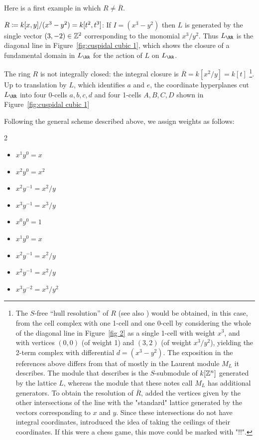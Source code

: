 \documentclass{amsart}
\begin{document}
Here is a first example in which $R \neq \overline R$.

\begin{example} 
  \label{ex:cuspidal-cubic}
  $R\coloneqq k[x,y]/(x^3-y^2) = k[t^{2},t^{3}]$:
If $I = (x^3-y^2)$ then $L$ is generated by the single vector
$ (3,-2) \in \mathbb Z^2$ corresponding to the monomial $x^3/y^2$. Thus
$L_\RR$ is the diagonal line in Figure~\ref{fig:cuspidal cubic 1}, which
shows the closure of a fundamental domain in $L_\RR$ for the action of $L$
on $L_\RR$.

The ring $R$ is not integrally closed: the integral closure is $\overline R = k[x^{2}/y] = k[t]$
\footnote{The $S$-free ``hull resolution'' of $R$ \cite[Section 3]{Bayer-Sturmfels} (see also \cite[Sections 9.2--9.3]{MScomb}) would be obtained, in this case, from the cell complex with one 1-cell and one 0-cell by considering the whole of the diagonal line in Figure~\ref{fig 2} as a single 1-cell with weight $x^3$, and with vertices
$(0,0)$ (of weight 1) and $(3,2)$ (of weight $x^3/y^2$), yielding the 2-term complex with differential
$d = (x^3-y^2)$.
The exposition in the references above differs from
that of \cite{BCHSY} mostly in the Laurent module $M_L$ it describes. The module that \cite{Bayer-Sturmfels} describes is the $S$-submodule of $k[\mathbb Z^n]$ generated by the lattice $L$, whereas the module that these notes call $M_L$ has additional generators.
To obtain the resolution of $\overline R$, \cite{BCHSY} added the vertices given by
the other intersections of the line with the "standard" lattice generated
by the vectors corresponding to $x$ and $y$. Since these intersections do not have integral coordinates, \cite{BCHSY} introduced the idea of taking the ceilings of 
their coordinates. 
If this were a chess game, this move could be marked with "!!".}.
Up to translation by $L$, which identifies $a$ and $e$, the coordinate hyperplanes cut $L_\RR$ into four 0-cells $a,b,c,d$ and four 1-cells $A,B,C,D$ shown in Figure~\ref{fig:cuspidal cubic 1} 

\goodbreak


Following the general scheme described above, we assign weights as follows:
\begin{multicols}{2}
  \begin{itemize}
  \item[$\Psi(A)$:] $x^1y^0 = x$
  \item[$\Psi(B)$:] $x^2y^0 = x^2$
  \item[$\Psi(C)$:] $x^2y^{-1} = x^2/y$
  \item[$\Psi(D)$:] $x^3y^{-1} = x^3/y$
    \smallskip
  \item[$\Psi(a)$:] $x^0y^0 = 1$
  \item[$\Psi(b)$:] $x^1y^0 = x$
  \item[$\Psi(c)$:] $x^2y^{-1} = x^2/y$
  \item[$\Psi(d)$:] $x^2y^{-1} = x^2/y$
  \item[$\Psi(e)$:] $x^3y^{-2} = x^3/y^{2}$
  \end{itemize}
\end{multicols}


\end{example}
\end{document}

